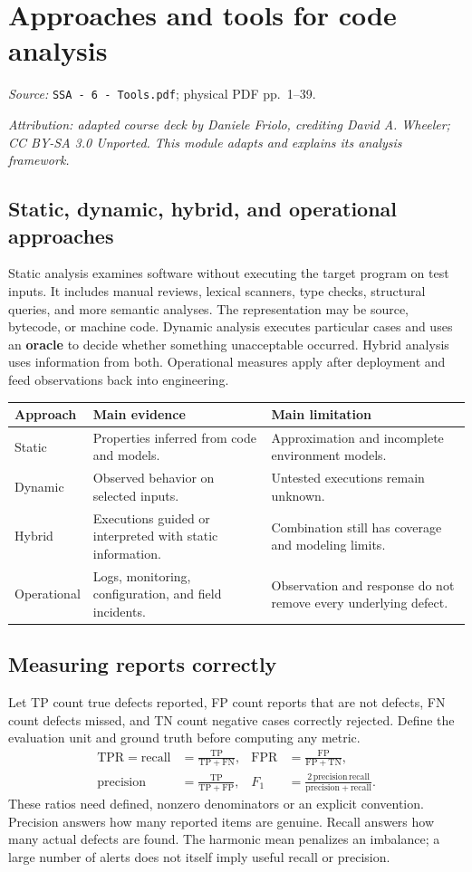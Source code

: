 \documentclass[11pt,a4paper]{article}
\newcommand{\currentmodule}{Contents}
\newcommand{\source}[2]{\textcolor{muted}{\small\textit{Source:} \nolinkurl{#1}; physical PDF pp.~#2.}\par\medskip}
\newcommand{\module}[2]{\par\Needspace{8\baselineskip}\gdef\currentmodule{#1}\section{#1}\label{#2}}
\numberwithin{figure}{section}
\begin{document}
\module{Approaches and tools for code analysis}{sec:tools}
\source{SSA - 6 - Tools.pdf}{1--39}
\textit{Attribution: adapted course deck by Daniele Friolo, crediting David A. Wheeler; CC BY-SA 3.0 Unported. This module adapts and explains its analysis framework.}

\subsection{Static, dynamic, hybrid, and operational approaches}
Static analysis examines software without executing the target program on test inputs. It includes manual reviews, lexical scanners, type checks, structural queries, and more semantic analyses. The representation may be source, bytecode, or machine code. Dynamic analysis executes particular cases and uses an \textbf{oracle} to decide whether something unacceptable occurred. Hybrid analysis uses information from both. Operational measures apply after deployment and feed observations back into engineering.

\par\noindent\begin{tabularx}{\linewidth}{@{}lYY@{}}\toprule
Approach & Main evidence & Main limitation\\\midrule
Static & Properties inferred from code and models. & Approximation and incomplete environment models.\\
Dynamic & Observed behavior on selected inputs. & Untested executions remain unknown.\\
Hybrid & Executions guided or interpreted with static information. & Combination still has coverage and modeling limits.\\
Operational & Logs, monitoring, configuration, and field incidents. & Observation and response do not remove every underlying defect.\\\bottomrule
\end{tabularx}\par

\subsection{Measuring reports correctly}
Let TP count true defects reported, FP count reports that are not defects, FN count defects missed, and TN count negative cases correctly rejected. Define the evaluation unit and ground truth before computing any metric.
\begin{align*}
\mathrm{TPR}=\mathrm{recall}&=\frac{\mathrm{TP}}{\mathrm{TP}+\mathrm{FN}}, &
\mathrm{FPR}&=\frac{\mathrm{FP}}{\mathrm{FP}+\mathrm{TN}},\\
\mathrm{precision}&=\frac{\mathrm{TP}}{\mathrm{TP}+\mathrm{FP}}, &
F_1&=\frac{2\,\mathrm{precision}\,\mathrm{recall}}{\mathrm{precision}+\mathrm{recall}}.
\end{align*}
These ratios need defined, nonzero denominators or an explicit convention. Precision answers how many reported items are genuine. Recall answers how many actual defects are found. The harmonic mean penalizes an imbalance; a large number of alerts does not itself imply useful recall or precision.
\end{document}
